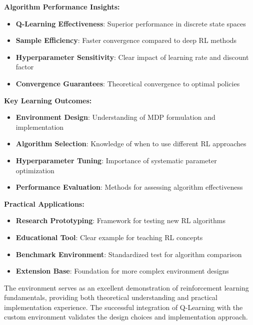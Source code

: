 \documentclass[12pt]{article}
\begin{document}
{{{\textbf{Algorithm Performance Insights:}
\begin{itemize}
    \item \textbf{Q-Learning Effectiveness}: Superior performance in discrete state spaces
    \item \textbf{Sample Efficiency}: Faster convergence compared to deep RL methods
    \item \textbf{Hyperparameter Sensitivity}: Clear impact of learning rate and discount factor
    \item \textbf{Convergence Guarantees}: Theoretical convergence to optimal policies
\end{itemize}

\textbf{Key Learning Outcomes:}
\begin{itemize}
    \item \textbf{Environment Design}: Understanding of MDP formulation and implementation
    \item \textbf{Algorithm Selection}: Knowledge of when to use different RL approaches
    \item \textbf{Hyperparameter Tuning}: Importance of systematic parameter optimization
    \item \textbf{Performance Evaluation}: Methods for assessing algorithm effectiveness
\end{itemize}

\textbf{Practical Applications:}
\begin{itemize}
    \item \textbf{Research Prototyping}: Framework for testing new RL algorithms
    \item \textbf{Educational Tool}: Clear example for teaching RL concepts
    \item \textbf{Benchmark Environment}: Standardized test for algorithm comparison
    \item \textbf{Extension Base}: Foundation for more complex environment designs
\end{itemize}

The environment serves as an excellent demonstration of reinforcement learning fundamentals, providing both theoretical understanding and practical implementation experience. The successful integration of Q-Learning with the custom environment validates the design choices and implementation approach.

}}




\newpage

}
\end{document}
